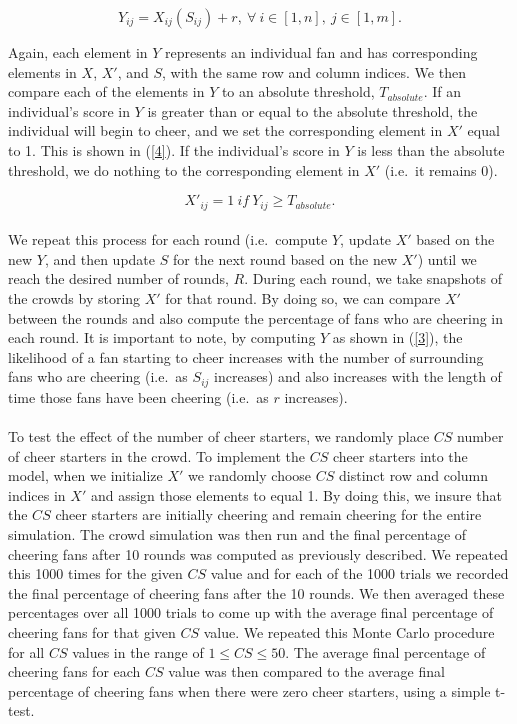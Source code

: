 \documentclass[oneside,12pt]{report}
\begin{document}
\begin{equation}
Y_{ij}=X_{ij}(S_{ij})+r,~\forall~i\in[1,n],~j\in[1,m].
\label{3}
\end{equation}

Again, each element in $Y$ represents an individual fan and has corresponding elements in $X$, $X'$, and $S$, with the same row and column indices. We then compare each of the elements in $Y$ to an absolute threshold, $T_{absolute}$. If an individual's score in $Y$ is greater than or equal to the absolute threshold, the individual will begin to cheer, and we set the corresponding element in $X'$ equal to 1. This is shown in (\ref{4}). If the individual's score in $Y$ is less than the absolute threshold, we do nothing to the corresponding element in $X'$ (i.e.~it remains 0).  

\begin{equation}
X'_{ij}=1~if~Y_{ij}\geq T_{absolute}.
\label{4}
\end{equation}

\paragraph{}
We repeat this process for each round (i.e.~compute $Y$, update $X'$ based on the new $Y$, and then update $S$ for the next round based on the new $X'$) until we reach the desired number of rounds, $R$. During each round, we take snapshots of the crowds by storing $X'$ for that round. By doing so, we can compare $X'$ between the rounds and also compute the percentage of fans who are cheering in each round. It is important to note, by computing $Y$ as shown in (\ref{3}), the likelihood of a fan starting to cheer increases with the number of surrounding fans who are cheering (i.e.~as $S_{ij}$ increases) and also increases with the length of time those fans have been cheering (i.e.~as $r$ increases).

\paragraph{}
To test the effect of the number of cheer starters, we randomly place $CS$ number of cheer starters in the crowd. To implement the $CS$ cheer starters into the model, when we initialize $X'$ we randomly choose $CS$ distinct row and column indices in $X'$ and assign those elements to equal 1. By doing this, we insure that the $CS$ cheer starters are initially cheering and remain cheering for the entire simulation. The crowd simulation was then run and the final percentage of cheering fans after 10 rounds was computed as previously described. We repeated this 1000 times for the given $CS$ value and for each of the 1000 trials we recorded the final percentage of cheering fans after the 10 rounds. We then averaged these percentages over all 1000 trials to come up with the average final percentage of cheering fans for that given $CS$ value. We repeated this Monte Carlo procedure for all $CS$ values in the range of $1 \leq CS \leq 50$. The average final percentage of cheering fans for each $CS$ value was then compared to the average final percentage of cheering fans when there were zero cheer starters, using a simple t-test.
\end{document}
